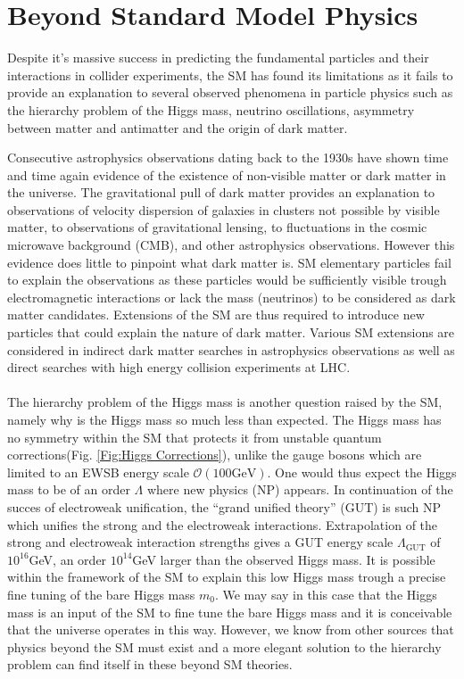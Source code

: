 \section{Beyond Standard Model Physics}

Despite it's massive success in predicting the fundamental particles and their interactions in collider experiments, the SM has found its limitations as it fails to provide an explanation to several observed phenomena in particle physics such as the hierarchy problem of the Higgs mass, neutrino oscillations, asymmetry between matter and antimatter and the origin of dark matter. 

Consecutive astrophysics observations dating back to the 1930s have shown time and time again evidence of the existence of non-visible matter or dark matter in the universe. The gravitational pull of dark matter provides an explanation to observations of velocity dispersion of galaxies in clusters not possible by visible matter, to observations of gravitational lensing, to fluctuations in the cosmic microwave background (CMB), and other astrophysics observations. However this evidence does little to pinpoint what dark matter is. SM elementary particles fail to explain the observations as these particles would be sufficiently visible trough electromagnetic interactions or lack the mass (neutrinos) to be considered as dark matter candidates. Extensions of the SM are thus required to introduce new particles that could explain the nature of dark matter. Various SM extensions are considered in indirect dark matter searches in astrophysics observations as well as direct searches with high energy collision experiments at LHC.\\
\\
The hierarchy problem of the Higgs mass is another question raised by the SM, namely why is the Higgs mass so much less than expected. The Higgs mass has no symmetry within the SM that protects it from unstable quantum corrections(Fig. \ref{Fig:Higgs Corrections}), unlike the gauge bosons which are limited to an EWSB energy scale $\mathcal{O}(100\text{GeV})$. One would thus expect the Higgs mass to be of an order $\Lambda$ where new physics (NP) appears. In continuation of the succes of electroweak unification, the “grand unified theory” (GUT) is such NP which unifies the strong and the electroweak interactions. Extrapolation of the strong and electroweak interaction strengths gives a GUT energy scale $\Lambda_{\text{GUT}}$ of $ 10^{16}$GeV, an order $10^{14}$GeV larger than the observed Higgs mass. It is possible within the framework of the SM to explain this low Higgs mass trough a precise fine tuning of the bare Higgs mass $m_0$. We may say in this case that the Higgs mass is an input of the SM to fine tune the bare Higgs mass and it is conceivable that the universe operates in this way. However, we know from other sources that physics beyond the SM must exist and a more elegant solution to the hierarchy problem can find itself in these beyond SM theories.  
